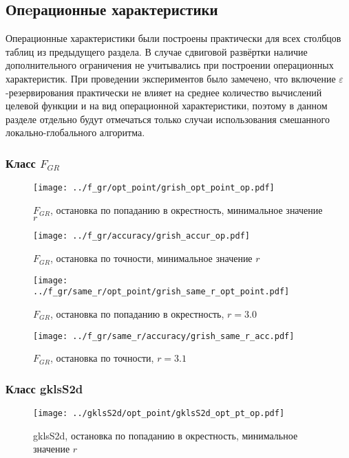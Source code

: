 \documentclass[a4paper]{article}
\begin{document}
\subsection{Опeрационные характеристики}
Операционные характеристики были построены практически для всех столбцов таблиц из предыдущего раздела.
В случае сдвиговой развёртки наличие дополнительного ограничения не учитывались при построении операционных характеристик.
При проведении экспериментов было замечено, что включение $\varepsilon$-резервирования практически не влияет на среднее
количество вычислений целевой функции и на вид операционной характеристики, поэтому в данном разделе отдельно будут отмечаться
только случаи использования смешанного локально-глобального алгоритма.

\subsubsection{Класс $F_{GR}$}

\begin{figure}
  \center
  \texttt{[image: ../f\_gr/opt\_point/grish\_opt\_point\_op.pdf]}
  \caption{$F_{GR}$, остановка по попаданию в окрестность, минимальное значение $r$}
  \label{fig:}
\end{figure}

\begin{figure}[H]
  \center
  \texttt{[image: ../f\_gr/accuracy/grish\_accur\_op.pdf]}
  \caption{$F_{GR}$, остановка по точности, минимальное значение $r$}
  \label{fig:}
\end{figure}

\begin{figure}[H]
  \center
  \texttt{[image: ../f\_gr/same\_r/opt\_point/grish\_same\_r\_opt\_point.pdf]}
  \caption{$F_{GR}$, остановка по попаданию в окрестность, $r=3.0$}
  \label{fig:}
\end{figure}

\begin{figure}[H]
  \center
  \texttt{[image: ../f\_gr/same\_r/accuracy/grish\_same\_r\_acc.pdf]}
  \caption{$F_{GR}$, остановка по точности, $r=3.1$}
  \label{fig:}
\end{figure}

\subsubsection{Класс gklsS2d}

\begin{figure}
  \center
  \texttt{[image: ../gklsS2d/opt\_point/gklsS2d\_opt\_pt\_op.pdf]}
  \caption{gklsS2d, остановка по попаданию в окрестность, минимальное значение $r$}
  \label{fig:}
\end{figure}
\end{document}
